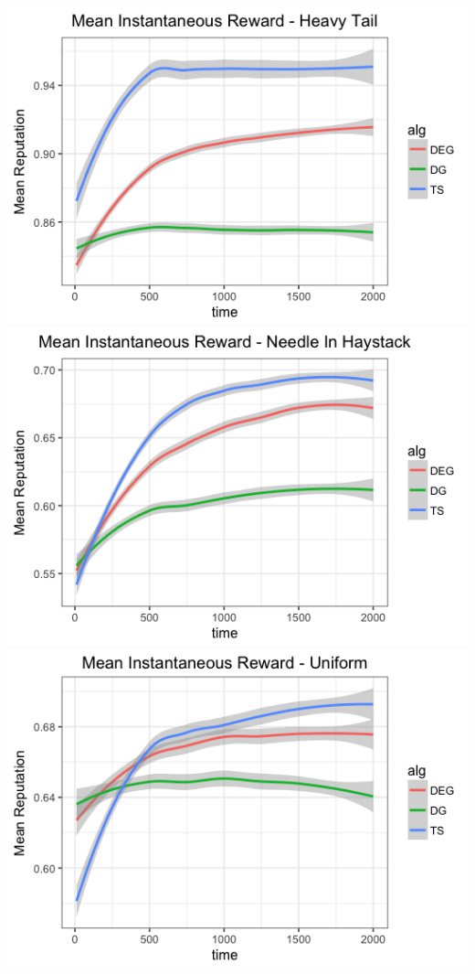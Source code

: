 \documentclass[11pt,letterpaper]{article}
\begin{document}
\begin{center}
\includegraphics[scale=0.5]{figures/mean_inst_reward_ht} \\
\includegraphics[scale=0.5]{figures/mean_inst_reward_nih} \\
\includegraphics[scale=0.5]{figures/mean_inst_reward_uniform}
\end{center}
\end{document}
